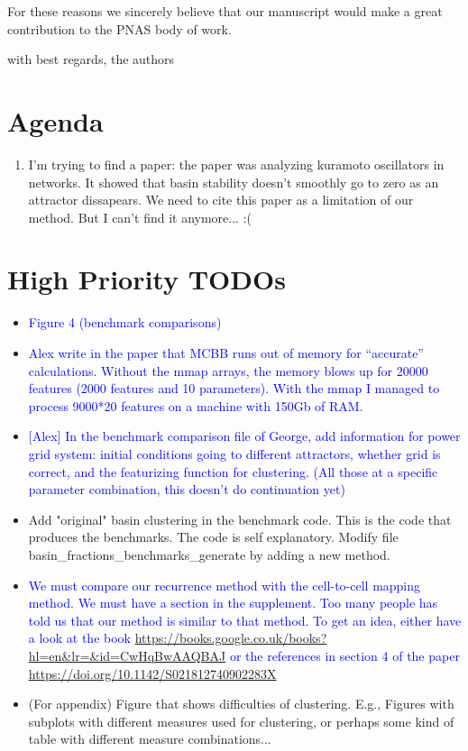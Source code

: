 \documentclass{article}
\newcommand{\alex}[1]{\textcolor{blue}{#1}}
\newcommand{\kalel}[1]{\textcolor{OliveGreen}{#1}}
\begin{document}
For these reasons we sincerely believe that our manuscript would make a great contribution to the PNAS body of work.

with best regards,
the authors

\section{Agenda}
\begin{enumerate}

\item I'm trying to find a paper: the paper was analyzing kuramoto oscillators in networks. It showed that basin stability doesn't smoothly go to zero as an attractor dissapears. We need to cite this paper as a limitation of our method. But I can't find it anymore... :(
\end{enumerate}


\section{High Priority TODOs}
\begin{itemize}
    \item \alex{Figure 4 (benchmark comparisons)}
    \item \alex{Alex write in the paper that MCBB runs out of memory for ``accurate'' calculations. Without the mmap arrays, the memory blows up for 20000 features (2000 features and 10 parameters). With the mmap I managed to process 9000*20 features on a machine with 150Gb of RAM.}
    \item \alex{[Alex] In the benchmark comparison file of George, add information for power grid system: initial conditions going to different attractors, whether grid is correct, and the featurizing function for clustering. (All those at a specific parameter combination, this doesn't do continuation yet)}
    \item \kalel{Add "original" basin clustering in the benchmark code. This is the code that produces the benchmarks. The code is self explanatory. Modify file basin\_fractions\_benchmarks\_generate by adding a new method.}
    \item \alex{We must compare our recurrence method with the cell-to-cell mapping method. We must have a section in the supplement. Too many people has told us that our method is similar to that method. To get an idea, either have a look at the book \url{https://books.google.co.uk/books?hl=en&lr=&id=CwHqBwAAQBAJ} or the references in section 4 of the paper \url{https://doi.org/10.1142/S021812740902283X}}
    \item (For appendix) Figure that shows difficulties of clustering. E.g., Figures with subplots with different measures used for clustering, or perhaps some kind of table with different measure combinations...
\end{itemize}
\end{document}
